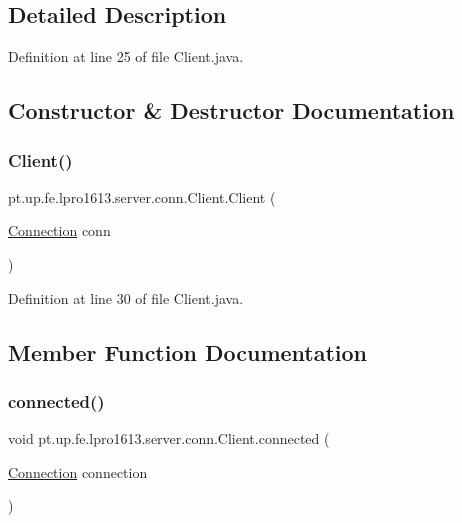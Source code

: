 \subsection{Detailed Description}


Definition at line 25 of file Client.\+java.



\subsection{Constructor \& Destructor Documentation}
\hypertarget{classpt_1_1up_1_1fe_1_1lpro1613_1_1server_1_1conn_1_1_client_a057095008df340effc95b69dbda5b643}{}\label{classpt_1_1up_1_1fe_1_1lpro1613_1_1server_1_1conn_1_1_client_a057095008df340effc95b69dbda5b643} 
\subsubsection{\texorpdfstring{Client()}{Client()}}
{\footnotesize\ttfamily pt.\+up.\+fe.\+lpro1613.\+server.\+conn.\+Client.\+Client (\begin{DoxyParamCaption}\item[{\hyperlink{classpt_1_1up_1_1fe_1_1lpro1613_1_1sharedlib_1_1conn_1_1_connection}{Connection}}]{conn }\end{DoxyParamCaption})}



Definition at line 30 of file Client.\+java.



\subsection{Member Function Documentation}
\hypertarget{classpt_1_1up_1_1fe_1_1lpro1613_1_1server_1_1conn_1_1_client_a1cf160e68d7310d9f0b3a53d8b26f80d}{}\label{classpt_1_1up_1_1fe_1_1lpro1613_1_1server_1_1conn_1_1_client_a1cf160e68d7310d9f0b3a53d8b26f80d} 
\subsubsection{\texorpdfstring{connected()}{connected()}}
{\footnotesize\ttfamily void pt.\+up.\+fe.\+lpro1613.\+server.\+conn.\+Client.\+connected (\begin{DoxyParamCaption}\item[{\hyperlink{classpt_1_1up_1_1fe_1_1lpro1613_1_1sharedlib_1_1conn_1_1_connection}{Connection}}]{connection }\end{DoxyParamCaption})}

